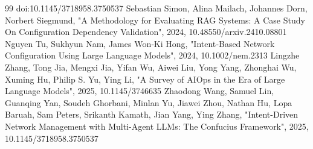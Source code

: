 \documentclass[conference]{IEEEtran}
\begin{document}
\begin{thebibliography}{99}
 doi:10.1145/3718958.3750537
 Sebastian Simon, Alina Mailach, Johannes Dorn, Norbert Siegmund, "A Methodology for Evaluating RAG Systems: A Case Study On Configuration Dependency Validation", 2024, 10.48550/arxiv.2410.08801
 Nguyen Tu, Sukhyun Nam, James Won‐Ki Hong, "Intent‐Based Network Configuration Using Large Language Models", 2024, 10.1002/nem.2313
 Lingzhe Zhang, Tong Jia, Mengxi Jia, Yifan Wu, Aiwei Liu, Yong Yang, Zhonghai Wu, Xuming Hu, Philip S. Yu, Ying Li, "A Survey of AIOps in the Era of Large Language Models", 2025, 10.1145/3746635
 Zhaodong Wang, Samuel Lin, Guanqing Yan, Soudeh Ghorbani, Minlan Yu, Jiawei Zhou, Nathan Hu, Lopa Baruah, Sam Peters, Srikanth Kamath, Jian Yang, Ying Zhang, "Intent-Driven Network Management with Multi-Agent LLMs: The Confucius Framework", 2025, 10.1145/3718958.3750537
\end{thebibliography}
\end{document}
